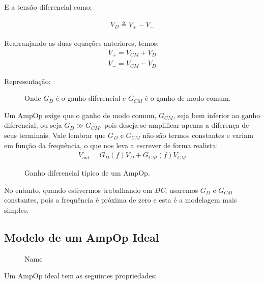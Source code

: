 E a tensão diferencial como:

\begin{align}
  V_{D} \triangleq V_{+}-V_{-}
\end{align}

Rearranjando as duas equações anteriores, temos:
\begin{align}
  V_{+}  = V_{CM} + V_{D} \\
  V_{-}  = V_{CM} - V_{D}
\end{align}

Representação:
\begin{figure}[htpb]
  \centering
  \caption{Onde $G_D$ é o ganho diferencial e $G_{CM}$ é o ganho de modo comum.}
  \label{fig:name}
\end{figure}

Um AmpOp exige que o ganho de modo comum, $G_{CM}$, seja bem inferior ao ganho diferencial, ou seja $G_{D}\gg G_{CM}$,
pois deseja-se amplificar apenas a diferença de seus terminais. Vale lembrar que $G_{D}$ e $G_{CM}$ não são termos 
constantes e variam em função da frequência, o que nos leva a escrever de forma realista:
\begin{align*}
  V_{out}  = G_{D}(f) V_{D} + G_{CM}(f) V_{CM}
\end{align*}
\begin{figure}[htpb]
  \centering
  \caption{Ganho diferencial típico de um AmpOp.}
  \label{fig:name}
\end{figure}
No entanto, quando estivermos trabalhando em \emph{DC}, usaremos $G_{D}$ e $G_{CM}$ 
constantes, pois a frequência é próxima de zero e esta é a modelagem mais simples.
\subsection{Modelo de um AmpOp Ideal}
\begin{figure}[htpb]
  \centering
  \caption{Name}
  \label{fig:name}
\end{figure}

Um AmpOp ideal tem as seguintes propriedades:

